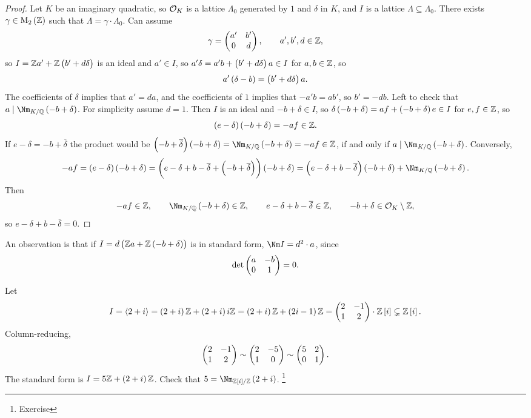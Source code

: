 \begin{proof}
Let $ K $ be an imaginary quadratic, so $ \mathcal{O}_K $ is a lattice $ \Lambda_0 $ generated by $ 1 $ and $ \delta $ in $ K $, and $ I $ is a lattice $ \Lambda \subseteq \Lambda_0 $. There exists $ \gamma \in \M_2\br{\ZZ} $ such that $ \Lambda = \gamma \cdot \Lambda_0 $. Can assume
$$ \gamma = \begin{pmatrix} a' & b' \\ 0 & d \end{pmatrix}, \qquad a', b', d \in \mathbb{Z}, $$
so $ I = \ZZ a' + \ZZ\br{b' + d\delta} $ is an ideal and $ a' \in I $, so $ a'\delta = a'b + \br{b' + d\delta}a \in I $ for $ a, b \in \mathbb{Z} $, so
$$ a'\br{\delta - b} = \br{b' + d\delta}a. $$
The coefficients of $ \delta $ implies that $ a' = da $, and the coefficients of $ 1 $ implies that $ -a'b = ab' $, so $ b' = -db $. Left to check that $ a \mid \Nm_{K / \QQ} \br{-b + \delta} $. For simplicity assume $ d = 1 $. Then $ I $ is an ideal and $ -b + \delta \in I $, so $ \delta\br{-b + \delta} = af + \br{-b + \delta}e \in I $ for $ e, f \in \mathbb{Z} $, so
$$ \br{e - \delta}\br{-b + \delta} = -af \in \ZZ. $$
If $ e - \delta = -b + \overline{\delta} $ the product would be $ \br{-b + \overline{\delta}}\br{-b + \delta} = \Nm_{K / \QQ} \br{-b + \delta} = -af \in \ZZ $, if and only if $ a \mid \Nm_{K / \QQ} \br{-b + \delta} $. Conversely,
$$ -af = \br{e - \delta}\br{-b + \delta} = \br{e - \delta + b - \overline{\delta} + \br{-b + \overline{\delta}}}\br{-b + \delta} = \br{e - \delta + b - \overline{\delta}}\br{-b + \delta} + \Nm_{K / \QQ} \br{-b + \delta}. $$
Then
$$ -af \in \ZZ, \qquad \Nm_{K / \QQ} \br{-b + \delta} \in \ZZ, \qquad e - \delta + b - \overline{\delta} \in \ZZ, \qquad -b + \delta \in \OOO_K \setminus \ZZ, $$
so $ e - \delta + b - \overline{\delta} = 0 $.
\end{proof}

An observation is that if $ I = d\br{\ZZ a + \ZZ\br{-b + \delta}} $ is in standard form, $ \Nm I = d^2 \cdot a $, since
$$ \det \begin{pmatrix} a & -b \\ 0 & 1 \end{pmatrix} = 0. $$


\begin{example*}
Let
$$ I = \abr{2 + i} = \br{2 + i}\ZZ + \br{2 + i}i\ZZ = \br{2 + i}\ZZ + \br{2i - 1}\ZZ = \twobytwo{2}{-1}{1}{2} \cdot \ZZ\sbr{i} \subsetneq \ZZ\sbr{i}. $$
Column-reducing,
$$ \begin{pmatrix} 2 & -1 \\ 1 & 2 \end{pmatrix} \sim \begin{pmatrix} 2 & -5 \\ 1 & 0 \end{pmatrix} \sim \begin{pmatrix} 5 & 2 \\ 0 & 1 \end{pmatrix}. $$
The standard form is $ I = 5\ZZ + \br{2 + i}\ZZ $. Check that $ 5 = \Nm_{\ZZ\sbr{i} / \ZZ} \br{2 + i} $. \footnote{Exercise}
\end{example*}

\pagebreak

